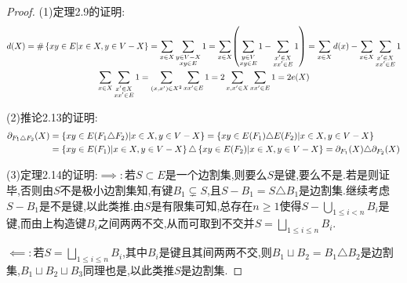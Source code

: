\documentclass[11pt]{article}
\begin{document}
\begin{proof}
(1)定理2.9的证明:
$$\begin{gathered}
        d(X)=\#\left\{xy\in E|x\in X, y\in V-X\right\}=\sum_{x\in X}\sum_{\substack{y\in V-X\\ xy\in E}}1=\sum_{x\in X}\!\left(\sum_{\substack{y\in V\\ xy\in E}}1-\sum_{\substack{x'\in X\\ xx'\in E}}1\right)=\sum_{x\in X}d(x)-\sum_{x\in X}\sum_{\substack{x'\in X\\ xx'\in E}}1\\
        \sum_{x\in X}\sum_{\substack{x'\in X\\ xx'\in E}}1=\sum_{(x,x')\in X^2}\sum_{xx'\in E}1=2\sum_{x,x'\in X}\sum_{xx'\in E}1=2e(X)
    \end{gathered}$$

(2)推论2.13的证明:
$$\begin{aligned}
        \partial_{F_1\triangle F_2}(X) & =\left\{xy\in E(F_1\triangle F_2)|x\in X, y\in V-X\right\}=\left\{xy\in E(F_1)\triangle E(F_2)|x\in X, y\in V-X\right\}                          \\
                                       & =\left\{xy\in E(F_1)|x\in X, y\in V-X\right\}\triangle \left\{xy\in E(F_2)|x\in X, y\in V-X\right\}=\partial_{F_1}(X)\triangle \partial_{F_2}(X)
    \end{aligned}$$

(3)定理2.14的证明:$\implies:$若$S\subset E$是一个边割集,则要么$S$是键,要么不是.若是则证毕,否则由$S$不是极小边割集知,有键$B_1\subsetneq S$,且$S-B_1=S\triangle B_1$是边割集.继续考虑$S-B_1$是不是键,以此类推.由$S$是有限集可知,总存在$n\geq 1$使得$S-\bigcup_{1\leq i< n}B_i$是键,而由上构造键$B_i$之间两两不交,从而可取到不交并$S=\bigsqcup_{1\leq i\leq n}B_i$.

$\impliedby:$若$S=\bigsqcup_{1\leq i\leq n}B_i$,其中$B_i$是键且其间两两不交,则$B_1\sqcup B_2=B_1\triangle B_2$是边割集,$B_1\sqcup B_2\sqcup B_3$同理也是,以此类推$S$是边割集.
\end{proof}
\end{document}
